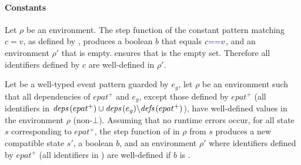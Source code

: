 \begin{skippableproof}
    \paragraph{Constants}
    Let $\rho$ be an environment. The step function of the constant pattern matching $c = v$, as
    defined by , produces a boolean $b$ that
    equals $c \kwf{==} v$, and an environment $\rho'$ that is empty.
     ensures that  is the empty set.
    Therefore all identifiers defined by $c$ are well-defined in $\rho'$.

    \setcounter{paragraph}{0}
\end{skippableproof}

\begin{lemma}
    \label{lem:semantics:grsync:theorems:productivity:epat}
    Let  be a well-typed \GRSync event pattern guarded by $e_g$, let $\rho$ be
    an environment such that all dependencies of $epat^+$ and $e_g$, except those defined by
    $epat^+$ (\ie all identifiers in ${\textit{deps}\left(epat^+\right)} \cup {\ensuremath{\textit{deps}\left(e_g\right)}} \backslash {\ensuremath{\textit{defs}\left(epat^+\right)}}$), have
    well-defined values in the environment $\rho$ (non-$\bot$).
    Assuming that no runtime errors occur, for all state $s$ corresponding to $epat^+$, the step
    function of  in $\rho$ from $s$ produces a new compatible state $s'$, a
    boolean $b$, and an environment $\rho'$ where identifiers defined by $epat^+$ (\ie all
    identifiers in ) are well-defined if $b$ is \true.
\end{lemma}
